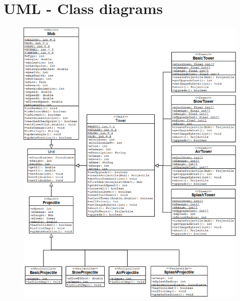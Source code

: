 
\chapter{UML - Class diagrams}

\begin{figure}[here]

\begin{center}

\includegraphics[scale=0.35]{pics/chapters/AppendixA/units_class_diagram}

\end{center}

\end{figure}

\clearpage

